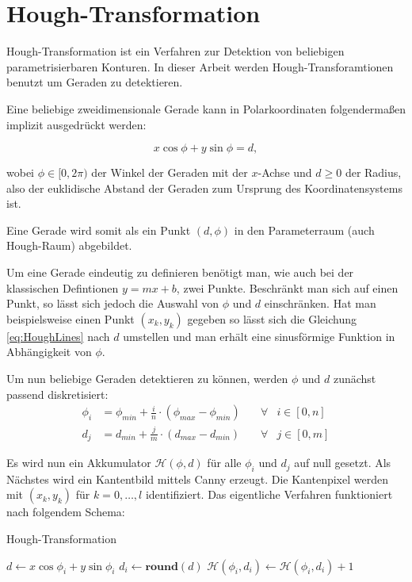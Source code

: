 \section{Hough-Transformation}
\label{s:hough}
Hough-Transformation ist ein Verfahren zur Detektion von beliebigen parametrisierbaren Konturen. In dieser Arbeit werden Hough-Transforamtionen benutzt um Geraden zu detektieren. 

Eine beliebige zweidimensionale Gerade kann in Polarkoordinaten folgendermaßen implizit ausgedrückt werden:

\begin{equation}\label{eq:HoughLines}
x\cos\phi + y\sin\phi = d,
\end{equation}

wobei $\phi \in [0,2\pi)$ der Winkel der Geraden mit der $x$-Achse und $d \geq 0$ der Radius, also der euklidische Abstand der Geraden zum Ursprung des Koordinatensystems ist.

Eine Gerade wird somit als ein Punkt $(d,\phi)$ in den Parameterraum (auch Hough-Raum) abgebildet. 

Um eine Gerade eindeutig zu definieren benötigt man, wie auch bei der klassischen Defintionen $y = mx + b$, zwei Punkte. Beschränkt man sich auf einen Punkt, so lässt sich jedoch die Auswahl von $\phi$ und $d$ einschränken. Hat man beispielsweise einen Punkt $(x_k,y_k)$ gegeben so lässt sich die Gleichung \ref{eq:HoughLines} nach $d$ umstellen und man erhält eine sinusförmige Funktion in Abhängigkeit von $\phi$. 

Um nun beliebige Geraden detektieren zu können, werden $\phi$ und $d$ zunächst passend diskretisiert:
\[
	\begin{aligned}
		\phi_i &= \phi_{min} + \frac{i}{n} \cdot (\phi_{max} - \phi_{min}) \quad&\forall &i\in [0,n]\\
		d_j &= d_{min} + \frac{j}{m} \cdot  (d_{max} - d_{min}) &\forall &j\in [0,m]
	\end{aligned}
\]



Es wird nun ein Akkumulator $\mathcal{H}(\phi, d)$ für alle $\phi_i$ und $d_j$ auf null gesetzt.
Als Nächstes wird ein Kantentbild mittels Canny \cite{Canny1986} erzeugt. Die Kantenpixel werden mit $(x_k,y_k)$ für $k = 0,\dotsc,l$ identifiziert. Das eigentliche Verfahren funktioniert nach folgendem Schema:

\begin{algorithm}
	\caption{Hough-Transformation}\label{euclid}
	\begin{algorithmic}[1]
		 
		 
		\State $d \gets x\cos\phi_i + y\sin\phi_i$
		\State $d_i \gets \textbf{round}(d)$ 
		\State  $\mathcal{H}(\phi_i, d_i) \gets \mathcal{H}(\phi_i, d_i) + 1$
		\EndFor
		\EndFor
	\end{algorithmic}
\end{algorithm}

